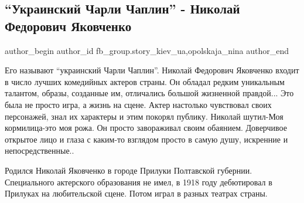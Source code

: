  
 
 
 
 
 
\subsection{\enquote{Украинский Чарли Чаплин} - Николай Федорович Яковченко}
\label{sec:14_12_2021.fb.fb_group.story_kiev_ua.2.jakovchenko_chaplin}
 
\ifcmt
 author_begin
   author_id fb_group.story_kiev_ua,opolskaja_nina
 author_end
\fi

Его называют \enquote{украинский Чарли Чаплин}. Николай Федорович Яковченко
входит в число лучших комедийных актеров страны. Он обладал редким уникальным
талантом, образы, созданные им, отличались большой жизненной правдой... Это
была не просто игра, а жизнь на сцене. Актер настолько чувствовал своих
персонажей, знал их характеры и этим покорял публику. Николай шутил-Моя
кормилица-это моя рожа.  Он просто завораживал своим обаянием. Доверчивое
открытое лицо и глаза с каким-то взглядом просто в самую душу, искренние и
непосредственные.. 

Родился Николай Яковченко в городе Прилуки Полтавской губернии. Специального
актерского образования не имел, в 1918 году дебютировал в Прилуках на
любительской сцене.  Потом играл в разных театрах страны. 

\begin{multicols}{2} %
\setlength{\parindent}{0pt}





\end{multicols} %

